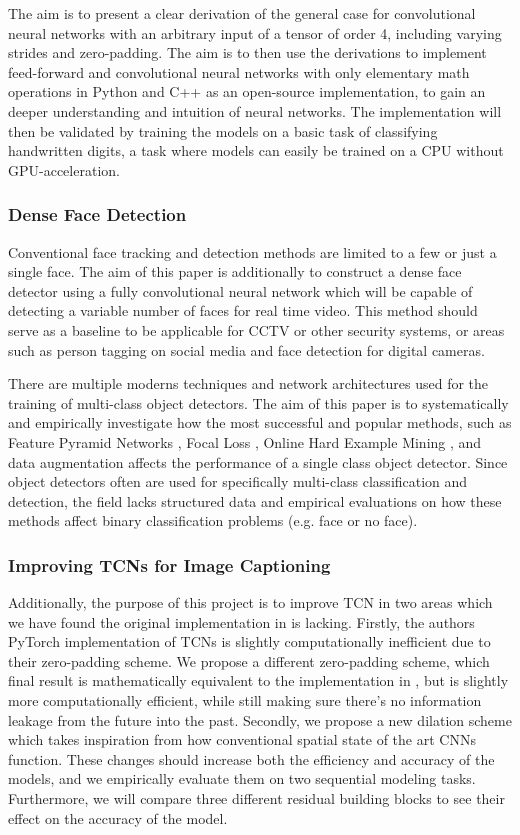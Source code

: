 \documentclass[a4paper, twoside]{article}
\begin{document}
The aim is to present a clear derivation of the general case for convolutional neural networks with an arbitrary input of a tensor of order 4, including varying strides and zero-padding. The aim is to then use the derivations to implement feed-forward and convolutional neural networks with only elementary math operations in Python and C++ as an open-source implementation, to gain an deeper understanding and intuition of neural networks. The implementation will then be validated by training the models on a basic task of classifying handwritten digits, a task where models can easily be trained on a CPU without GPU-acceleration.

\subsubsection{Dense Face Detection}
Conventional face tracking and detection methods are limited to a few or just a single face. The aim of this paper is additionally to construct a dense face detector using a fully convolutional neural network which will be capable of detecting a variable number of faces for real time video. This method should serve as a baseline to be applicable for CCTV or other security systems, or areas such as person tagging on social media and face detection for digital cameras.

There are multiple moderns techniques and network architectures used for the training of multi-class object detectors. The aim of this paper is to systematically and empirically investigate how the most successful and popular methods, such as Feature Pyramid Networks \cite{fpn}, Focal Loss \cite{retinanet}, Online Hard Example Mining \cite{ohem}, and data augmentation affects the performance of a single class object detector. Since object detectors often are used for specifically multi-class classification and detection, the field lacks structured data and empirical evaluations on how these methods affect binary classification problems (e.g. face or no face).


\subsubsection{Improving TCNs for Image Captioning}
Additionally, the purpose of this project is to improve TCN in two areas which we have found the original implementation in \cite{tcn} is lacking. Firstly, the authors PyTorch implementation of TCNs is slightly computationally inefficient due to their zero-padding scheme. We propose a different zero-padding scheme, which final result is mathematically equivalent to the implementation in \cite{tcn}, but is slightly more computationally efficient, while still making sure there's no information leakage from the future into the past. Secondly, we propose a new dilation scheme which takes inspiration from how conventional spatial state of the art CNNs function. These changes should increase both the efficiency and accuracy of the models, and we empirically evaluate them on two sequential modeling tasks. Furthermore, we will compare three different residual building blocks to see their effect on the accuracy of the model.
\end{document}

